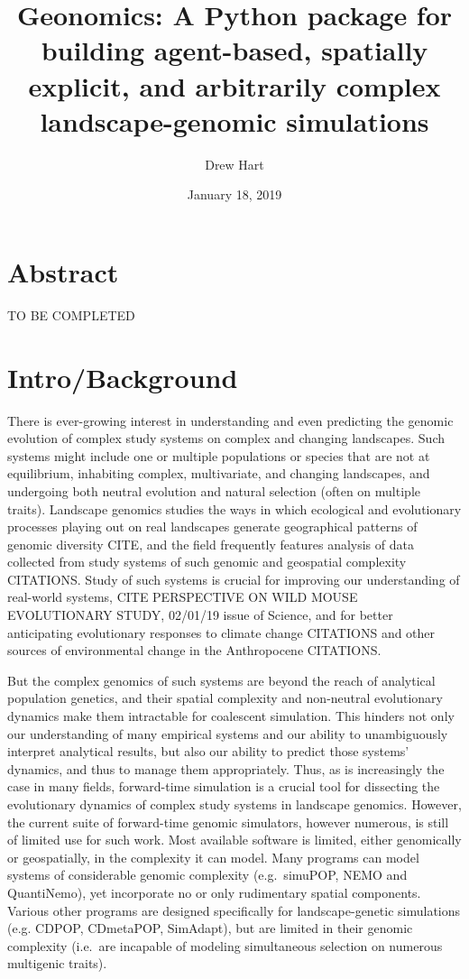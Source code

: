 ﻿\documentclass{article}
\title{Geonomics: A Python package for building agent-based, spatially explicit, and arbitrarily complex landscape-genomic simulations}
\author{Drew Hart}
\date{January 18, 2019}
\begin{document}
\maketitle

\section{Abstract}
{\LARGE TO BE COMPLETED}


\section{Intro/Background}
There is ever-growing interest in understanding and even predicting
the genomic evolution of complex study systems on complex and changing landscapes.
Such systems might include one or multiple populations or species that are not
at equilibrium, inhabiting complex, multivariate, and changing landscapes, and 
undergoing both neutral evolution and natural selection (often on multiple traits).
Landscape genomics studies the ways in which ecological and evolutionary processes playing
out on real landscapes generate geographical patterns of genomic diversity {\large CITE},
and the field frequently features analysis of data collected from study systems of such
genomic and geospatial complexity {\large CITATIONS}.
Study of such systems is crucial for improving our understanding of real-world systems, 
{\large CITE PERSPECTIVE ON WILD MOUSE EVOLUTIONARY STUDY, 02/01/19 issue of Science},
and for better anticipating evolutionary responses to climate change {\large CITATIONS}
and other sources of environmental change in the Anthropocene {\large CITATIONS}.

But the complex genomics of such systems are beyond the reach of analytical
population genetics, and their spatial complexity and non-neutral evolutionary
dynamics make them intractable for coalescent simulation.
This hinders not only our understanding of many empirical systems and our ability to
unambiguously interpret analytical results, but also our
ability to predict those systems' dynamics, and thus to manage them appropriately.
Thus, as is increasingly the case in many fields, forward-time simulation is a 
crucial tool for dissecting the evolutionary dynamics of complex study systems in landscape genomics.
However, the current suite of forward-time genomic simulators, however numerous, is still of limited use for such work.
Most available software is limited, either genomically or geospatially, in the complexity it can model.
Many programs can model systems of considerable genomic complexity (e.g.\ simuPOP, NEMO and QuantiNemo),
yet incorporate no or only rudimentary spatial components.
Various other programs are designed specifically for landscape-genetic simulations (e.g. CDPOP,
CDmetaPOP, SimAdapt), but are limited in their genomic complexity (i.e.\ are incapable of
modeling simultaneous selection on numerous multigenic traits).
\end{document}

